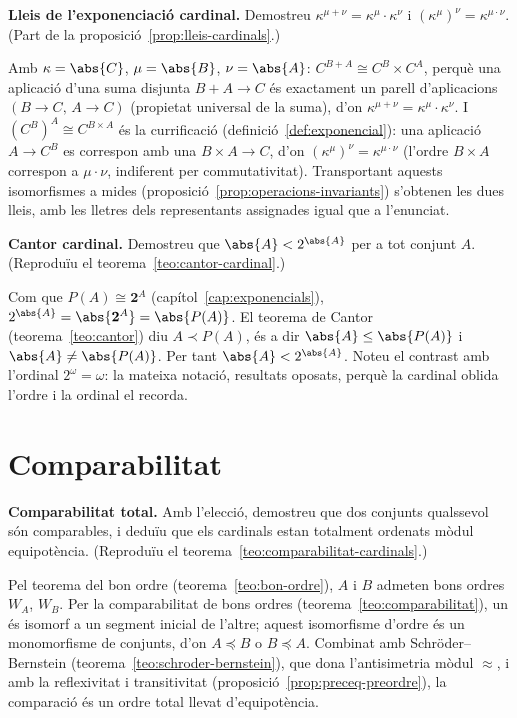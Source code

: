 \begin{exercici}
\textbf{Lleis de l'exponenciació cardinal.} Demostreu \(\kappa^{\mu+\nu}=\kappa^\mu\cdot\kappa^\nu\) i \((\kappa^\mu)^\nu=\kappa^{\mu\cdot\nu}\). (Part de la proposició~\ref{prop:lleis-cardinals}.)
\end{exercici}
\begin{solucio}
Amb \(\kappa=\abs{C}\), \(\mu=\abs{B}\), \(\nu=\abs{A}\): \(C^{B+A}\cong C^B\times C^A\), perquè una aplicació d'una suma disjunta \(B+A\to C\) és exactament un parell d'aplicacions \((B\to C,\,A\to C)\) (propietat universal de la suma), d'on \(\kappa^{\mu+\nu}=\kappa^\mu\cdot\kappa^\nu\). I \((C^B)^A\cong C^{B\times A}\) és la currificació (definició~\ref{def:exponencial}): una aplicació \(A\to C^B\) es correspon amb una \(B\times A\to C\), d'on \((\kappa^\mu)^\nu=\kappa^{\mu\cdot\nu}\) (l'ordre \(B\times A\) correspon a \(\mu\cdot\nu\), indiferent per commutativitat). Transportant aquests isomorfismes a mides (proposició~\ref{prop:operacions-invariants}) s'obtenen les dues lleis, amb les lletres dels representants assignades igual que a l'enunciat.
\end{solucio}

\begin{exercici}
\textbf{Cantor cardinal.} Demostreu que \(\abs{A}<2^{\abs{A}}\) per a tot conjunt \(A\). (Reproduïu el teorema~\ref{teo:cantor-cardinal}.)
\end{exercici}
\begin{solucio}
Com que \(P(A)\cong\mathbf2^A\) (capítol~\ref{cap:exponencials}), \(2^{\abs{A}}=\abs{\mathbf2^A}=\abs{P(A)}\). El teorema de Cantor (teorema~\ref{teo:cantor}) diu \(A\prec P(A)\), és a dir \(\abs{A}\le\abs{P(A)}\) i \(\abs{A}\neq\abs{P(A)}\). Per tant \(\abs{A}<2^{\abs{A}}\). Noteu el contrast amb l'ordinal \(2^\omega=\omega\): la mateixa notació, resultats oposats, perquè la cardinal oblida l'ordre i la ordinal el recorda.
\end{solucio}

\section{Comparabilitat}\label{prac:comparabilitat-cardinals}

\begin{exercici}
\textbf{Comparabilitat total.} Amb l'elecció, demostreu que dos conjunts qualssevol són comparables, i deduïu que els cardinals estan totalment ordenats mòdul equipotència. (Reproduïu el teorema~\ref{teo:comparabilitat-cardinals}.)
\end{exercici}
\begin{solucio}
Pel teorema del bon ordre (teorema~\ref{teo:bon-ordre}), \(A\) i \(B\) admeten bons ordres \(W_A\), \(W_B\). Per la comparabilitat de bons ordres (teorema~\ref{teo:comparabilitat}), un és isomorf a un segment inicial de l'altre; aquest isomorfisme d'ordre és un monomorfisme de conjunts, d'on \(A\preceq B\) o \(B\preceq A\). Combinat amb Schröder--Bernstein (teorema~\ref{teo:schroder-bernstein}), que dona l'antisimetria mòdul \(\approx\), i amb la reflexivitat i transitivitat (proposició~\ref{prop:preceq-preordre}), la comparació és un ordre total llevat d'equipotència.
\end{solucio}

